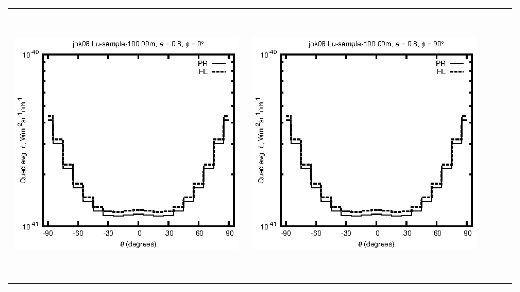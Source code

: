 \begin{tabular}{c c c c}
\includegraphics[height=7cm]{../eps/jok08_Lu_sample_100.00m_fwd.eps} &
\includegraphics[height=7cm]{../eps/jok08_Lu_sample_100.00m_cross.eps} \\
\end{tabular}

\pagebreak

